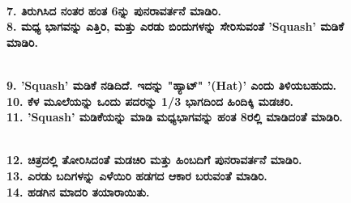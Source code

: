 \begin{figure}[H]
\\
\textbf{7. ತಿರುಗಿಸಿದ ನಂತರ ಹಂತ 6ನ್ನು ಪುನರಾವರ್ತನೆ ಮಾಡಿರಿ.}\\
\textbf{8. ಮಧ್ಯ ಭಾಗವನ್ನು ಎತ್ತಿರಿ, ಮತ್ತು ಎರಡು ಬಿಂದುಗಳನ್ನು ಸೇರಿಸುವಂತೆ 'Squash' ಮಡಿಕೆ ಮಾಡಿರಿ.}
\end{figure}
\begin{figure}[H]
\\
\textbf{9. 'Squash' ಮಡಿಕೆ ನಡಿದಿದೆ. ಇದನ್ನು "ಹ್ಯಾಟ್" '(Hat)' ಎಂದು ತಿಳಿಯಬಹುದು.}\\
\textbf{10. ಕೆಳ ಮೂಲೆಯನ್ನು ಒಂದು ಪದರನ್ನು 1/3 ಭಾಗದಿಂದ ಹಿಂದಿಕ್ಕಿ ಮಡಚರಿ.}\\
\textbf{11. 'Squash' ಮಡಿಕೆಯನ್ನು ಮಾಡಿ ಮಧ್ಯಭಾಗವನ್ನು ಹಂತ 8ರಲ್ಲಿ ಮಾಡಿದಂತೆ ಮಾಡಿರಿ.}
\end{figure}
\begin{figure}[H]
\\
\textbf{12. ಚಿತ್ರದಲ್ಲಿ ತೋರಿಸಿದಂತೆ ಮಡಚಿರಿ ಮತ್ತು ಹಿಂಬದಿಗೆ ಪುನರಾವರ್ತನೆ ಮಾಡಿರಿ.}\\
\textbf{13. ಎರಡು ಬದಿಗಳನ್ನು ಎಳೆಯಿರಿ ಹಡಗದ ಆಕಾರ ಬರುವಂತೆ ಮಾಡಿರಿ.}\\
\textbf{14. ಹಡಗಿನ ಮಾದರಿ ತಯಾರಾಯಿತು.}
\end{figure}

